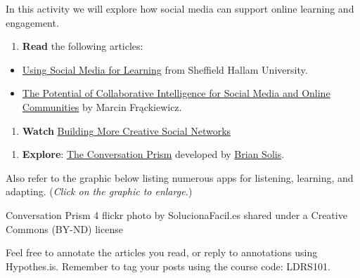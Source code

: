 \documentclass[
]{book}
\providecommand{\tightlist}{%
  \setlength{\itemsep}{0pt}\setlength{\parskip}{0pt}}
\theoremstyle{definition}
\theoremstyle{definition}
\theoremstyle{definition}
\theoremstyle{definition}
\theoremstyle{remark}
\begin{document}
\begin{reflect}
In this activity we will explore how social media can support online learning and engagement.

\begin{enumerate}
\def\labelenumi{\arabic{enumi}.}
\tightlist
\item
  \textbf{Read} the following articles:
\end{enumerate}

\begin{itemize}
\tightlist
\item
  \href{https://www.shu.ac.uk/digital-skills/personal/social-media-for-learning}{Using Social Media for Learning} from Sheffield Hallam University.\\
\item
  \href{https://ts2.space/en/the-potential-of-collaborative-intelligence-for-social-media-and-online-communities/}{The Potential of Collaborative Intelligence for Social Media and Online Communities} by Marcin Frąckiewicz.
\end{itemize}

\begin{enumerate}
\def\labelenumi{\arabic{enumi}.}
\setcounter{enumi}{1}
\tightlist
\item
  \textbf{Watch} \href{https://www.youtube.com/watch?v=Acc4zY1sQ0o}{Building More Creative Social Networks}
\end{enumerate}

\begin{enumerate}
\def\labelenumi{\arabic{enumi}.}
\setcounter{enumi}{1}
\tightlist
\item
  \textbf{Explore}: \href{https://www.briansolis.com/2008/08/introducing-conversation-prism-html/}{The Conversation Prism} developed by \href{https://www.briansolis.com/about/}{Brian Solis}.
\end{enumerate}

Also refer to the graphic below listing numerous apps for listening, learning, and adapting. (\emph{Click on the graphic to enlarge.})

Conversation Prism 4 flickr photo by SolucionaFacil.es shared under a Creative Commons (BY-ND) license
\end{reflect}

\begin{feedback}
Feel free to annotate the articles you read, or reply to annotations using Hypothes.is. Remember to tag your posts using the course code: LDRS101.
\end{feedback}
\end{document}
